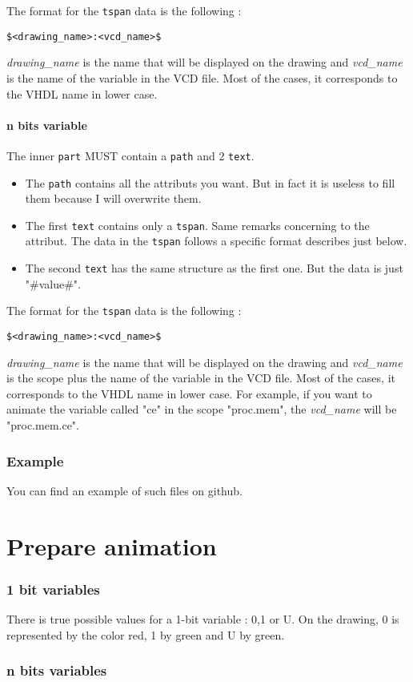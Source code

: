\documentclass[a4paper]{article}
\begin{document}
The format for the \texttt{tspan} data is the following :
\begin{center}
\texttt{\$<drawing\_name>:<vcd\_name>\$}
\end{center}
\emph{drawing\_name} is the name that will be displayed on the drawing and \emph{vcd\_name} is the name of the variable in the VCD file. Most of the cases, it corresponds to the VHDL name in lower case.

\subsection{n bits variable}
The inner \texttt{part} MUST contain a \texttt{path} and 2 \texttt{text}. 
\begin{itemize}
\item The \texttt{path} contains all the attributs you want. But in fact it is useless to fill them because  I will overwrite them.
\item The first \texttt{text} contains only a \texttt{tspan}. Same remarks concerning to the attribut. The data in the \texttt{tspan} follows a specific format describes just below.
\item The second \texttt{text} has the same structure as the first one. But the data is just "\#value\#". 
\end{itemize}

The format for the \texttt{tspan} data is the following :
\begin{center}
\texttt{\$<drawing\_name>:<vcd\_name>\$}
\end{center}
\emph{drawing\_name} is the name that will be displayed on the drawing and \emph{vcd\_name} is the scope plus the name of the variable in the VCD file. Most of the cases, it corresponds to the VHDL name in lower case. 
For example, if you want to animate the variable called "ce" in the scope "proc.mem", the \emph{vcd\_name} will be "proc.mem.ce". 

\section{Example}
You can find an example of such files on github. 

\newpage
\part{Prepare animation}
\newpage

\section{1 bit variables}
There is true possible values for a 1-bit variable : 0,1 or U. On the drawing, 0 is represented by the color red, 1 by green and U by green.
\section{n bits variables}
\end{document}
